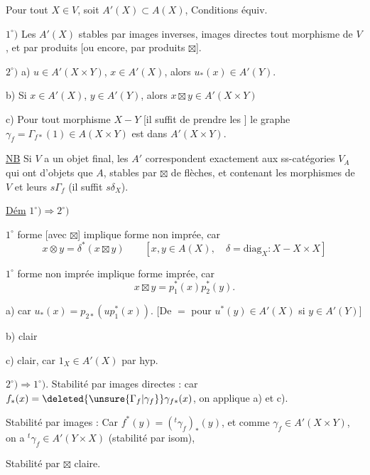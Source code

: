 
Pour tout $X\in V$, soit $A'(X)\subset A(X)$,  Conditions équiv.

$1^\circ)$ Les $A'(X)$ stables par images inverses, images directes  tout morphisme de $V$, et par produits [ou encore, par produits $\boxtimes$].

$2^\circ)$  a) $u\in A'(X\times Y)$, $x\in A'(X)$, alors $u_*(x)\in A'(Y)$.

b) Si $x\in A'(X)$, $y\in A'(Y)$, alors $x\boxtimes y\in A'(X\times Y)$

c) Pour tout morphisme $X\mathbin{-}Y$ [il suffit de prendre les ] le graphe $\gamma_f=\Gamma_{f*}(1)\in A(X\times Y)$ est dans $A'(X\times Y)$.


\uline{NB} Si $V$ a un objet final, les $A'$ correspondent exactement aux ss-catégories  $V_{A}$ qui ont  d'objets que $A$, stables par $\boxtimes$ de flèches, et contenant les   morphismes de $V$ et leurs $s\Gamma_f$ (il suffit $s\delta_X$).

\uline{Dém} \quad $1^\circ)\Longrightarrow 2^\circ)$

$1^\circ$ forme  [avec $\boxtimes$] implique forme non imprée, car
\[
 x\otimes y=\delta^*(x\boxtimes y)\qquad[x,y\in A(X),\quad\delta=\mathrm{diag}_X\colon X\mathbin{-}X\times X]
\]

$1^\circ$ forme non imprée implique forme imprée, car
\[
 x\boxtimes y=p_1^*(x)p_2^*(y).
\]

a) car $u_*(x)=p_{2*}(u p_1^*(x))$. [De $=$ pour $u^*(y)\in A'(X)$ si $y\in A'(Y)$]

b) clair

c) clair, car $1_X\in A'(X)$ par hyp.

$2^\circ)\Longrightarrow 1^\circ)$. Stabilité par images  directes : car $f_*(x)=\deleted{\unsure{\Gamma_f|\gamma_f}}\gamma_{f*}(x)$, on applique a) et c).

Stabilité par images   : Car $f^*(y)=({}^{t}\gamma_f)_*(y)$, et comme $\gamma_f\in A'(X\times Y)$, on a $ {}^{t}\gamma_f\in A'(Y\times X)$ (stabilité par isom),

Stabilité par $\boxtimes$ claire.
